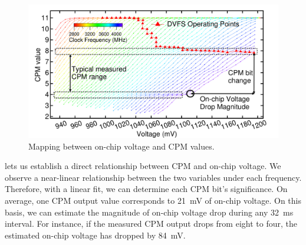 \begin{figure}
\centering
      \includegraphics[trim=25 0 25 0,clip,width=0.75\linewidth]{graphs/voltage/cpm2volt.pdf}
      \caption{Mapping between on-chip voltage and CPM values.}
      \label{fig:cpm2volt} 
\end{figure}

 lets us establish a direct relationship between CPM and on-chip voltage. We observe a near-linear relationship between the two variables under each frequency. Therefore, with a linear fit, we can determine each CPM bit's significance. On average, one CPM output value corresponds to 21~mV of on-chip voltage. On this basis, we can estimate the magnitude of on-chip voltage drop during any 32~ms interval. For instance, if the measured CPM output drops from eight to four, the estimated on-chip voltage has dropped by 84~mV. 

